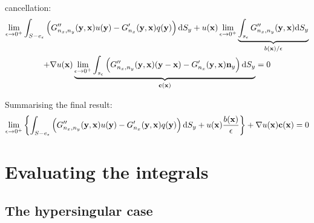 \documentclass[a4paper,11pt]{article}
\newcommand{\td}{\mathrm{d}}
\begin{document}
%
cancellation:
%
\begin{multline}
\lim_{\epsilon \to 0^+}
\int_{S-e_{\epsilon}}
\left(
G''_{n_x,n_y}({\bf y}, {\bf x}) u({\bf y})
- G'_{n_x}({\bf y}, {\bf x}) q({\bf y})
\right)
\td S_y
+
u({\bf x})
\lim_{\epsilon \to 0^+}
\underbrace{
\int_{s_{\epsilon}}
G''_{n_x,n_y}({\bf y}, {\bf x}) 
\td S_y
}_{b({\bf x})/\epsilon}
\\
+
\nabla u({\bf x}) 
\underbrace{
\lim_{\epsilon \to 0^+}
\int_{s_{\epsilon}}
\left(
G''_{n_x,n_y}({\bf y}, {\bf x}) ({\bf y} - {\bf x})
- G'_{n_x}({\bf y}, {\bf x}) {\bf n}_y
\right)
\td S_y
}_{\bf c({\bf x})}
= 0
\end{multline}
%

Summarising the final result:
%
\begin{equation}
\lim_{\epsilon \to 0^+}
\left\{
\int_{S-e_{\epsilon}}
\left(
G''_{n_x,n_y}({\bf y}, {\bf x}) u({\bf y})
- G'_{n_x}({\bf y}, {\bf x}) q({\bf y})
\right)
\td S_y
+
u({\bf x})
\frac{b({\bf x})}{\epsilon}
\right\}
+
\nabla u({\bf x}) 
{\bf c}({\bf x})
= 0
\end{equation}


\section{Evaluating the integrals}

\subsection{The hypersingular case}
\end{document}
